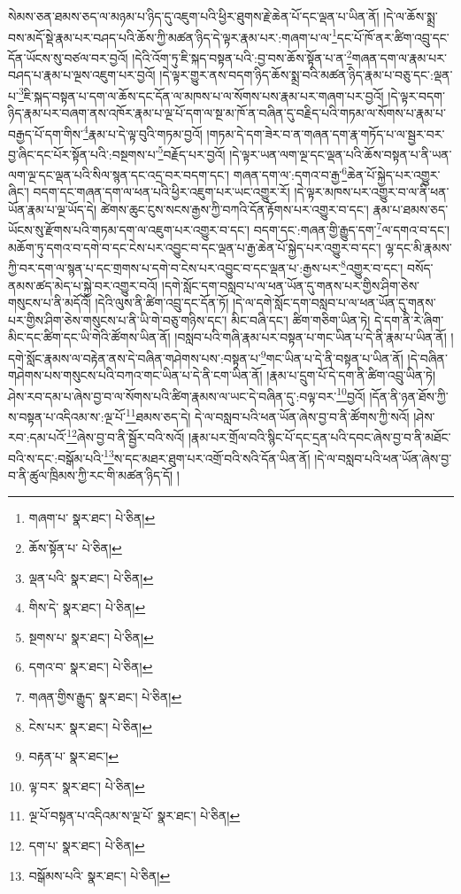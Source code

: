 སེམས་ཅན་ཐམས་ཅད་ལ་མཉམ་པ་ཉིད་དུ་འཇུག་པའི་ཕྱིར་ཐུགས་རྗེ་ཆེན་པོ་དང་ལྡན་པ་ཡིན་ནོ། །དེ་ལ་ཆོས་སྨྲ་བས་མདོ་སྡེ་རྣམ་པར་བཤད་པའི་ཆོས་ཀྱི་མཚན་ཉིད་དེ་ལྟར་རྣམ་པར་:གཞག་པ་ལ་\footnote{གཞག་པ་  སྣར་ཐང་།  པེ་ཅིན། }དང་པོ་ཁོ་ནར་ཚིག་འབྲུ་དང་དོན་ཡོངས་སུ་བཙལ་བར་བྱའོ། །དེའི་འོག་ཏུ་ཇི་སྐད་བསྟན་པའི་:བྱ་བས་ཆོས་སྟོན་པ་ན་\footnote{ཆོས་སྟོན་པ་  པེ་ཅིན། }གཞན་དག་ལ་རྣམ་པར་བཤད་པ་རྣམ་པ་ལྔས་འཇུག་པར་བྱའོ། །དེ་ལྟར་གྱུར་ནས་བདག་ཉིད་ཆོས་སྨྲ་བའི་མཚན་ཉིད་རྣམ་པ་བཅུ་དང་:ལྡན་པ་\footnote{ལྡན་པའི་  སྣར་ཐང་།  པེ་ཅིན། }ཇི་སྐད་བསྟན་པ་དག་ལ་ཆོས་དང་དོན་ལ་མཁས་པ་ལ་སོགས་པས་རྣམ་པར་གཞག་པར་བྱའོ། །དེ་ལྟར་བདག་ཉིད་རྣམ་པར་བཞག་ནས་འཁོར་རྣམ་པ་ལྔ་པོ་དག་ལ་སྔ་མ་ཁོ་ན་བཞིན་དུ་བརྗིད་པའི་གཏམ་ལ་སོགས་པ་རྣམ་པ་བརྒྱད་པོ་དག་གིས་\footnote{གིས་དེ་  སྣར་ཐང་།  པེ་ཅིན། }རྣམ་པ་དེ་ལྟ་བུའི་གཏམ་བྱའོ། །གཏམ་དེ་དག་ཟེར་བ་ན་གཞན་དག་རྣ་གཏོད་པ་ལ་སྦྱར་བར་བྱ་ཞིང་དང་པོར་སྟོན་པའི་:བསྔགས་པ་\footnote{སྔགས་པ་  སྣར་ཐང་།  པེ་ཅིན། }བརྗོད་པར་བྱའོ། །དེ་ལྟར་ཡན་ལག་ལྔ་དང་ལྡན་པའི་ཆོས་བསྟན་པ་ནི་ཡན་ལག་ལྔ་དང་ལྡན་པའི་སིལ་སྙན་དང་འདྲ་བར་བདག་དང་། གཞན་དག་ལ་:དགའ་བ་རྒྱ་\footnote{དགའ་བ་  སྣར་ཐང་།  པེ་ཅིན། }ཆེན་པོ་སྐྱེད་པར་འགྱུར་ཞིང་། བདག་དང་གཞན་དག་ལ་ཕན་པའི་ཕྱིར་འཇུག་པར་ཡང་འགྱུར་རོ། །དེ་ལྟར་མཁས་པར་འགྱུར་བ་ལ་ནི་ཕན་ཡོན་རྣམ་པ་ལྔ་ཡོད་དེ། ཚེགས་ཆུང་ངུས་སངས་རྒྱས་ཀྱི་བཀའི་དོན་རྟོགས་པར་འགྱུར་བ་དང་། རྣམ་པ་ཐམས་ཅད་ཡོངས་སུ་རྫོགས་པའི་གཏམ་དག་ལ་འཇུག་པར་འགྱུར་བ་དང་། བདག་དང་:གཞན་གྱི་རྒྱུད་དག་\footnote{གཞན་གྱིས་རྒྱུད་  སྣར་ཐང་།  པེ་ཅིན། }ལ་དགའ་བ་དང་། མཆོག་ཏུ་དགའ་བ་དགེ་བ་དང་ངེས་པར་འབྱུང་བ་དང་ལྡན་པ་རྒྱ་ཆེན་པོ་སྐྱེད་པར་འགྱུར་བ་དང་། ལྷ་དང་མི་རྣམས་ཀྱི་བར་དག་ལ་སྙན་པ་དང་གྲགས་པ་དགེ་བ་ངེས་པར་འབྱུང་བ་དང་ལྡན་པ་:རྒྱས་པར་\footnote{ངེས་པར་  སྣར་ཐང་།  པེ་ཅིན། }འགྱུར་བ་དང་། བསོད་ནམས་ཚད་མེད་པ་སྐྱེ་བར་འགྱུར་བའོ། །དགེ་སློང་དག་བསླབ་པ་ལ་ཕན་ཡོན་དུ་གནས་པར་གྱིས་ཤིག་ཅེས་གསུངས་པ་ནི་མདོའོ། །དེའི་ལུས་ནི་ཚིག་འབྲུ་དང་དོན་ཏོ། །དེ་ལ་དགེ་སློང་དག་བསླབ་པ་ལ་ཕན་ཡོན་དུ་གནས་པར་གྱིས་ཤིག་ཅེས་གསུངས་པ་ནི་ཡི་གེ་བཅུ་གཉིས་དང་། མིང་བཞི་དང་། ཚིག་གཅིག་ཡིན་ཏེ། དེ་དག་ནི་རེ་ཞིག་མིང་དང་ཚིག་དང་ཡི་གེའི་ཚོགས་ཡིན་ནོ། །བསླབ་པའི་གཞི་རྣམ་པར་བསྟན་པ་གང་ཡིན་པ་དེ་ནི་རྣམ་པ་ཡིན་ནོ། །དགེ་སློང་རྣམས་ལ་བརྟེན་ནས་དེ་བཞིན་གཤེགས་པས་:བསྟན་པ་\footnote{བརྟན་པ་  སྣར་ཐང་། }གང་ཡིན་པ་དེ་ནི་བསྟན་པ་ཡིན་ནོ། །དེ་བཞིན་གཤེགས་པས་གསུངས་པའི་བཀའ་གང་ཡིན་པ་དེ་ནི་ངག་ཡིན་ནོ། །རྣམ་པ་དྲུག་པོ་དེ་དག་ནི་ཚིག་འབྲུ་ཡིན་ཏེ། ཤེས་རབ་དམ་པ་ཞེས་བྱ་བ་ལ་སོགས་པའི་ཚིག་རྣམས་ལ་ཡང་དེ་བཞིན་དུ་:བལྟ་བར་\footnote{ལྟ་བར་  སྣར་ཐང་།  པེ་ཅིན། }བྱའོ། །དོན་ནི་ཉན་ཐོས་ཀྱི་ས་བསྟན་པ་འདིའམ་ས་:ལྔ་པོ་\footnote{ལྔ་པོ་བསྟན་པ་འདིའམ་ས་ལྔ་པོ་  སྣར་ཐང་།  པེ་ཅིན། }ཐམས་ཅད་དེ། དེ་ལ་བསླབ་པའི་ཕན་ཡོན་ཞེས་བྱ་བ་ནི་ཚོགས་ཀྱི་སའོ། །ཤེས་རབ་:དམ་པའོ་\footnote{དག་པ་  སྣར་ཐང་།  པེ་ཅིན། }ཞེས་བྱ་བ་ནི་སྦྱོར་བའི་སའོ། །རྣམ་པར་གྲོལ་བའི་སྙིང་པོ་དང་དྲན་པའི་དབང་ཞེས་བྱ་བ་ནི་མཐོང་བའི་ས་དང་:བསྒོམ་པའི་\footnote{བསྒོམས་པའི་  སྣར་ཐང་།  པེ་ཅིན། }ས་དང་མཐར་ཐུག་པར་འགྲོ་བའི་སའི་དོན་ཡིན་ནོ། །དེ་ལ་བསླབ་པའི་ཕན་ཡོན་ཞེས་བྱ་བ་ནི་ཚུལ་ཁྲིམས་ཀྱི་རང་གི་མཚན་ཉིད་དོ། །
